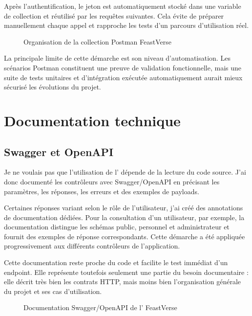 Après l'authentification, le jeton est automatiquement stocké dans une variable de collection et réutilisé par les requêtes suivantes. Cela évite de préparer manuellement chaque appel et rapproche les tests d'un parcours d'utilisation réel.

\begin{figure}[H]
\centering
{}
\caption{Organisation de la collection Postman FeastVerse}
\label{fig:postman-feastverse}
\end{figure}

La principale limite de cette démarche est son niveau d'automatisation. Les scénarios Postman constituent une preuve de validation fonctionnelle, mais une suite de tests unitaires et d'intégration exécutée automatiquement aurait mieux sécurisé les évolutions du projet.

\section{Documentation technique}

\subsection{Swagger et OpenAPI}

Je ne voulais pas que l'utilisation de l' dépende de la lecture du code source. J'ai donc documenté les contrôleurs avec Swagger/OpenAPI en précisant les paramètres, les réponses, les erreurs et des exemples de payloads.

Certaines réponses variant selon le rôle de l'utilisateur, j'ai créé des annotations de documentation dédiées. Pour la consultation d'un utilisateur, par exemple, la documentation distingue les schémas public, personnel et administrateur et fournit des exemples de réponse correspondants. Cette démarche a été appliquée progressivement aux différents contrôleurs de l'application.

Cette documentation reste proche du code et facilite le test immédiat d'un endpoint. Elle représente toutefois seulement une partie du besoin documentaire : elle décrit très bien les contrats HTTP, mais moins bien l'organisation générale du projet et ses cas d'utilisation.

\begin{figure}[H]
\centering
{}
\caption{Documentation Swagger/OpenAPI de l' FeastVerse}
\label{fig:swagger-feastverse}
\end{figure}

